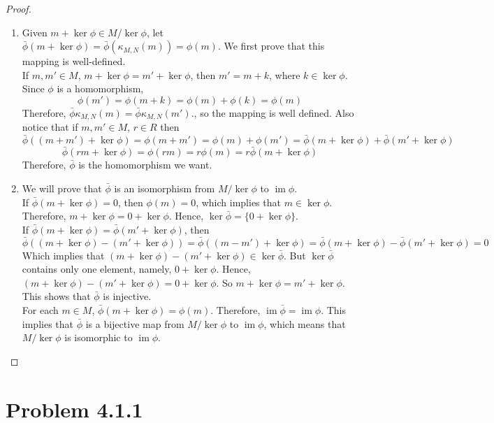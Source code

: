 \documentclass[12pt]{article}
\DeclareMathOperator{\im}{im}
\begin{document}
\begin{proof}
\begin{enumerate}
    \item Given $m + \ker \phi \in M/\ker \phi$, let $\bar{\phi}(m + \ker \phi) = \bar{\phi}(\kappa_{M, N}(m)) = \phi(m)$. We first prove that this mapping is well-defined. \\
    If $m, m' \in M$, $m + \ker \phi = m' + \ker \phi$, then $m' = m + k$, where $k \in \ker \phi$. Since $\phi$ is a homomorphism, 
    $$\phi(m') = \phi(m+k) = \phi(m)+\phi(k)=\phi(m)$$
    Therefore, $\bar{\phi} \kappa_{M, N}(m) = \bar{\phi} \kappa_{M, N}(m')$., so the mapping is well defined. Also notice that if $m, m' \in M$, $r\in R$ then 
    $$\bar{\phi}((m+m')+\ker \phi) = \phi(m+m')=\phi(m)+\phi(m')=\bar{\phi}(m+\ker \phi)+\bar{\phi}(m'+\ker \phi)$$
    $$\bar{\phi}(rm+\ker \phi) = \phi(rm) = r\phi(m) = r \bar{\phi}(m+\ker \phi)$$
    Therefore, $\bar{\phi}$ is the homomorphism we want.
    \item We will prove that $\bar{\phi}$ is an isomorphism from $M/\ker \phi$ to $\im \phi$. \\
    If $\bar{\phi}(m+\ker \phi) = 0$, then $\phi(m) = 0$, which implies that $m \in \ker \phi$. Therefore, $m + \ker \phi = 0 + \ker \phi$. Hence, $\ker \bar{\phi} = \{0+\ker\phi\}$. \\
    If $\bar{\phi}(m+\ker \phi) = \bar{\phi}(m'+\ker \phi)$, then $$\bar{\phi}((m+\ker \phi) - (m' + \ker\phi)) = \bar{\phi}((m-m')+\ker \phi) = \bar{\phi}(m+\ker \phi) - \bar{\phi}(m'+\ker \phi) = 0$$
    Which implies that $(m+\ker\phi)-(m'+\ker\phi) \in \ker \bar{\phi}$. But $\ker \bar{\phi}$ contains only one element, namely, $0 + \ker \phi$. Hence, $(m+\ker\phi)-(m'+\ker\phi)=0+\ker\phi$. So $m+\ker\phi=m'+\ker\phi$. This shows that $\bar{\phi}$ is injective.\\
    For each $m\in M$, $\bar{\phi}(m+\ker\phi)=\phi(m)$. Therefore, $\im \bar{\phi} = \im \phi$. This implies that $\bar{\phi}$ is a bijective map from $M/\ker\phi$ to $\im \phi$, which means that $M/\ker\phi$ is isomorphic to $\im \phi$.
\end{enumerate}
	
\end{proof}

\newpage 

\section{Problem 4.1.1}
\end{document}
